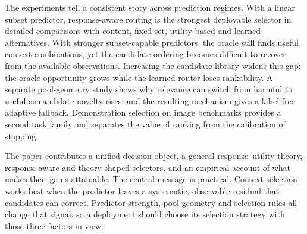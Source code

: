 The experiments tell a consistent story across prediction regimes. With a
linear subset predictor, response-aware routing is the strongest deployable
selector in detailed comparisons with content, fixed-set, utility-based and
learned alternatives. With stronger subset-capable predictors, the oracle still
finds useful context combinations, yet the candidate ordering becomes difficult
to recover from the available observations. Increasing the candidate library
widens this gap: the oracle opportunity grows while the learned router loses
rankability. A separate pool-geometry study shows why relevance can switch from
harmful to useful as candidate novelty rises, and the resulting mechanism gives
a label-free adaptive fallback. Demonstration selection on image benchmarks
provides a second task family and separates the value of ranking from the
calibration of stopping.

The paper contributes a unified decision object, a general response--utility
theory, response-aware and theory-shaped selectors, and an empirical account of
what makes their gains attainable. The central message is practical. Context
selection works best when the predictor leaves a systematic, observable
residual that candidates can correct. Predictor strength, pool geometry and
selection rules all change that signal, so a deployment should choose its
selection strategy with those three factors in view.
